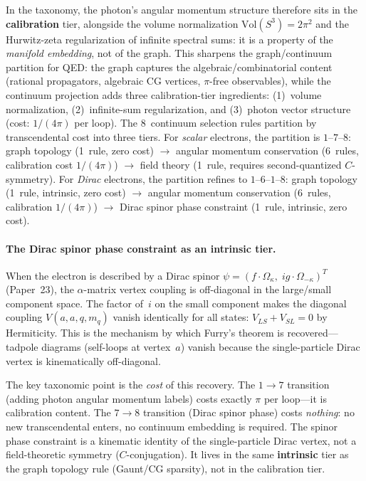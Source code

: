 \documentclass[aps,pra,twocolumn,superscriptaddress,longbibliography]{revtex4-2}
\begin{document}
In the taxonomy, the photon's angular momentum structure therefore
sits in the \textbf{calibration} tier, alongside the volume
normalization $\mathrm{Vol}(S^3) = 2\pi^2$ and the Hurwitz-zeta
regularization of infinite spectral sums: it is a property of the
\emph{manifold embedding}, not of the graph.  This sharpens the
graph/continuum partition for QED: the graph captures the
algebraic/combinatorial content (rational propagators, algebraic CG
vertices, $\pi$-free observables), while the continuum projection
adds three calibration-tier ingredients: (1)~volume normalization,
(2)~infinite-sum regularization, and (3)~photon vector structure
(cost: $1/(4\pi)$ per loop).
The 8~continuum selection rules partition by transcendental cost
into three tiers.  For \emph{scalar} electrons, the partition is
$1$--$7$--$8$: graph topology (1~rule, zero cost)
$\to$ angular momentum conservation (6~rules, calibration cost
$1/(4\pi)$) $\to$ field theory (1~rule, requires second-quantized
$C$-symmetry).  For \emph{Dirac} electrons, the partition refines
to $1$--$6$--$1$--$8$: graph topology (1~rule, intrinsic, zero cost)
$\to$ angular momentum conservation (6~rules, calibration $1/(4\pi)$)
$\to$ Dirac spinor phase constraint (1~rule, intrinsic, zero cost).

\paragraph{The Dirac spinor phase constraint as an intrinsic tier.}
When the electron is described by a Dirac spinor
$\psi = (f \cdot \Omega_\kappa,\; i g \cdot \Omega_{-\kappa})^T$
(Paper~23), the $\alpha$-matrix vertex coupling is off-diagonal in the
large/small component space.  The factor of~$i$ on the small component
makes the diagonal coupling $V(a,a,q,m_q)$ vanish identically for all
states: $V_{LS} + V_{SL} = 0$ by Hermiticity.  This is the mechanism
by which Furry's theorem is recovered---tadpole diagrams (self-loops at
vertex~$a$) vanish because the single-particle Dirac vertex is
kinematically off-diagonal.

The key taxonomic point is the \emph{cost} of this recovery.  The
$1 \to 7$ transition (adding photon angular momentum labels) costs
exactly $\pi$ per loop---it is calibration content.  The $7 \to 8$
transition (Dirac spinor phase) costs \emph{nothing}: no new
transcendental enters, no continuum embedding is required.  The spinor
phase constraint is a kinematic identity of the single-particle Dirac
vertex, not a field-theoretic symmetry ($C$-conjugation).  It lives in
the same \textbf{intrinsic} tier as the graph topology rule (Gaunt/CG
sparsity), not in the calibration tier.
\end{document}
